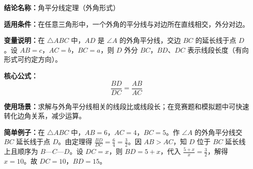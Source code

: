 \textbf{结论名称：}角平分线定理（外角形式）

\textbf{适用条件：}在任意三角形中，一个外角的平分线与对边所在直线相交，外分对边。

\textbf{变量说明：}在 $\triangle ABC$ 中，$AD$ 是 $\angle A$ 的外角平分线，交边 $BC$ 的延长线于点 $D$。设 $AB=c$，$AC=b$，$BC=a$，则 $D$ 外分 $BC$，$BD$、$DC$ 表示线段长度（有向形式可约定方向）。

\textbf{核心公式：}
\[
\boxed{\frac{BD}{DC} = \frac{AB}{AC}}
\]

\textbf{使用场景：}求解与外角平分线相关的线段比或线段长；在竞赛题和模拟题中可快速转化边角关系，减少运算。

\textbf{简单例子：}在 $\triangle ABC$ 中，$AB=6$，$AC=4$，$BC=5$。作 $\angle A$ 的外角平分线交 $BC$ 延长线于点 $D$。由定理得 $\frac{BD}{DC}=\frac{6}{4}=\frac{3}{2}$。因 $AB>AC$，知 $D$ 位于 $BC$ 延长线上且顺序为 $B$—$C$—$D$。设 $DC=x$，则 $BD=5+x$，代入 $\frac{5+x}{x}=\frac{3}{2}$，解得 $x=10$。故 $DC=10$，$BD=15$。